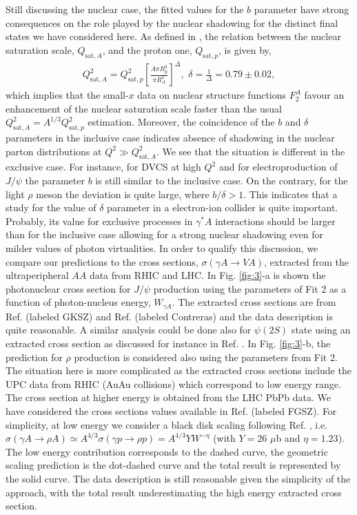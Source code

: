 \documentclass[twocolumn,showpacs,preprintnumbers,amsmath,amssymb,showkeys,aps,prd,a4paper,byrevtex]{revtex4}
\begin{document}
Still discussing the nuclear case, the fitted values for the $b$ parameter have strong consequences on the role played by the nuclear shadowing for the distinct final states we have considered here. As defined in \cite{Armesto_scal}, the relation between the nuclear saturation scale, $Q_{\mathrm{sat},A}$, and the proton one, $Q_{\mathrm{sat},p}$, is given by,
\begin{eqnarray}
Q_{\mathrm{sat},A}^2 = Q_{\mathrm{sat},p}^2\left[\frac{A\pi R_p^2}{ \pi R_A^2}\right]^{\Delta}, \,\,\delta = \frac{1}{\Delta} = 0.79\pm 0.02,
\end{eqnarray}
which implies that the small-$x$ data on nuclear structure functions $F_2^A$ favour an enhancement of the nuclear saturation scale faster than the usual $Q_{\mathrm{sat},A}^2 = A^{1/3}Q_{\mathrm{sat},p}^2$ estimation. Moreover, the coincidence of the $b$ and $\delta$ parameters in the inclusive case indicates absence of shadowing in the nuclear parton distributions at $Q^2\gg Q_{\mathrm{sat},A}^2$. We see that the situation is  different in the exclusive case. For instance, for DVCS at high $Q^2$ and for electroproduction of $J/\psi$ the parameter $b$ is still similar to the inclusive case. On the contrary, for the light $\rho$ meson the deviation is quite large, where $b/\delta >1$. This indicates that a study  for the value of $\delta$ parameter  in a electron-ion collider is quite important. Probably, its value for exclusive processes in $\gamma^*A$ interactions should be larger than for the inclusive case allowing for a strong nuclear shadowing even for milder values of photon virtualities. In order to qualify this discussion, we compare our predictions to the cross sections, $\sigma (\gamma A\rightarrow V A)$, extracted from the ultraperipheral $AA$ data from RHIC and LHC. In Fig. \ref{fig:3}-a is shown the photonuclear cross section for $J/\psi$ production using the parameters of Fit 2 as a function of photon-nucleus energy, $W_{\gamma A}$. The extracted cross sections are from Ref. \cite{Guzey:2013xba}  (labeled GKSZ) and Ref. \cite{Contreras:2016pkc}   (labeled Contreras) and the data description is quite reasonable. A similar analysis could be done also for $\psi (2S)$ state using an extracted cross section as discussed for instance in Ref. \cite{Guzey:2016piu}. In Fig. \ref{fig:3}-b, the prediction for $\rho$ production is considered also using the parameters from Fit 2. The situation here is more complicated as the extracted cross sections include the UPC data from RHIC (AuAu collisions) which correspond to low energy range. The cross section at higher energy is obtained from the LHC PbPb data. We have considered the cross sections values available in Ref. \cite{Frankfurt:2015cwa} (labeled FGSZ). For simplicity, at low energy we consider a black disk scaling  following Ref. \cite{Klein:1999qj}, i.e. $\sigma(\gamma A \rightarrow  \rho A)\simeq A^{4/3}\sigma(\gamma p \rightarrow  \rho p)=A^{4/3}YW^{-\eta}$ (with $Y= 26$ $\mu$b and $\eta = 1.23$). The low energy contribution corresponds to the dashed curve, the geometric scaling prediction is the dot-dashed curve and the total result is represented by the solid curve. The data description is still reasonable given the simplicity of the approach, with the total result underestimating the high energy extracted cross section.
\end{document}
